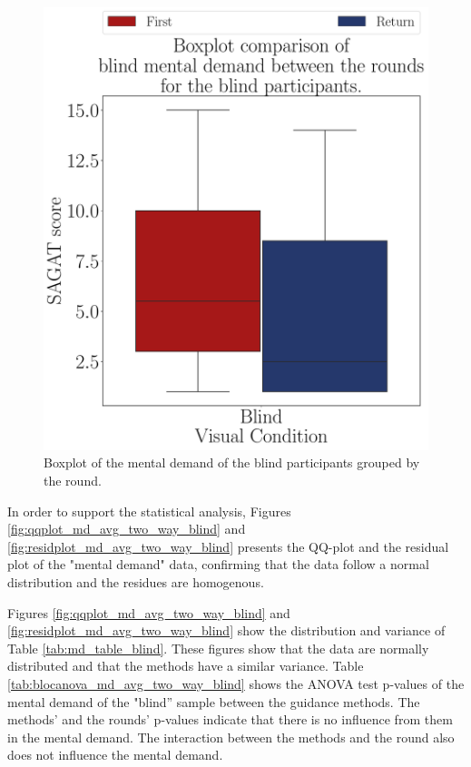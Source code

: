 \begin{figure}[!htb]
\begin{minipage}{0.075\textwidth}
        \hfill
    \end{minipage}
    \begin{minipage}{0.45\textwidth}
        \centering
        \includegraphics[width = \textwidth]{Resultados/Nasa/Figuras/pdf/boxplot_md_blind_rounds.pdf}
        \caption{Boxplot of the mental demand of the blind participants grouped by the round.}
        \label{fig:boxplot_md_blind_rounds}
    \end{minipage}
\end{figure}

In order to support the statistical analysis, Figures \ref{fig:qqplot_md_avg_two_way_blind} and \ref{fig:residplot_md_avg_two_way_blind} presents the QQ-plot and the residual plot of the "mental demand" data, confirming that the data follow a normal distribution and the residues are homogenous.

Figures \ref{fig:qqplot_md_avg_two_way_blind} and \ref{fig:residplot_md_avg_two_way_blind} show the distribution and variance of Table \ref{tab:md_table_blind}. These figures show that the data are normally distributed and that the methods have a similar variance. Table \ref{tab:blocanova_md_avg_two_way_blind} shows the ANOVA test p-values of the mental demand of the "blind” sample between the guidance methods. The methods' and the rounds' p-values indicate that there is no influence from them in the mental demand. The interaction between the methods and the round also does not influence the mental demand.

